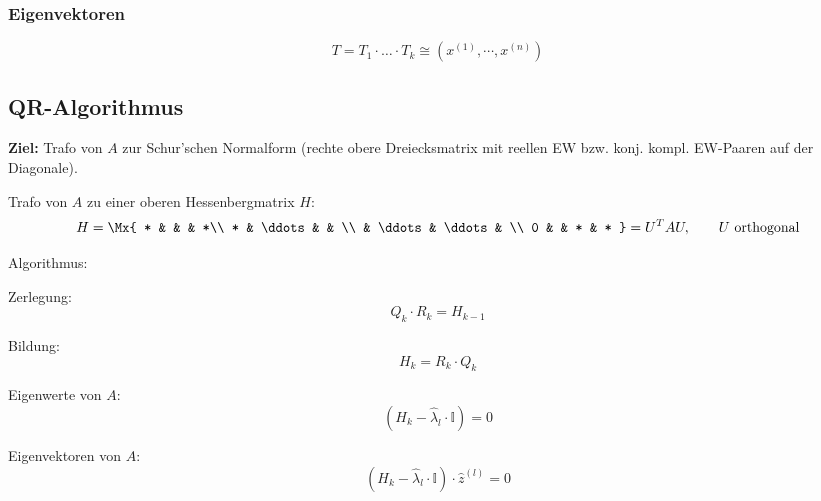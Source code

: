 		\subsubsection{Eigenvektoren}
			\[ 
				T= T_1 \cdot \dots \cdot T_k \cong (x^{(1)}, \cdots , x^{(n)})
			\]
	
	\subsection{QR-Algorithmus}
		\textbf{Ziel:} Trafo von $A$ zur Schur'schen Normalform (rechte obere Dreiecksmatrix mit reellen EW bzw. konj. kompl. EW-Paaren auf der Diagonale).
		
		\begin{tightenumerate}
			\item Trafo von $A$ zu einer oberen Hessenbergmatrix $H$:
				\[
					H = \Mx{
						* & & & *\\
						* & \ddots & & \\
						& \ddots & \ddots & \\
						0 & & * & *
					} = U^TAU,\qquad U \text{ orthogonal}
				\]
			\item Algorithmus: 
				\begin{tightenumerate}
					\item Zerlegung:
						\[
							Q_k \cdot R_k = H_{k-1}
						\]
					\item Bildung:
						\[
							H_k = R_k \cdot Q_k
						\]
				\end{tightenumerate}
			\item Eigenwerte von $A$:
				\[
					(H_k - \hat \lambda_l \cdot \mathbb{I})= 0
				\]
			\item Eigenvektoren von $A$:
				\[
					(H_k - \hat \lambda_l \cdot \mathbb{I})\cdot \hat z ^{(l)}= 0
				\]
		\end{tightenumerate}
